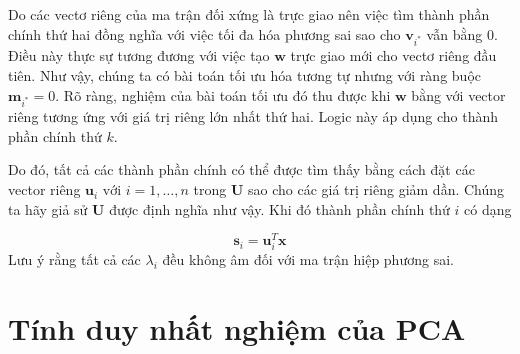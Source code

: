 \documentclass[12pt,a4paper,oneside]{report}
\numberwithin{equation}{section}
\begin{document}
Do các vectơ riêng của ma trận đối xứng là trực giao nên việc tìm thành phần chính thứ hai đồng nghĩa với việc tối đa hóa phương sai sao cho $\mathbf{v}_{i^{*}}$ vẫn bằng 0. Điều này thực sự tương đương với việc tạo $\mathbf{w}$ trực giao mới cho vectơ riêng đầu tiên. Như vậy, chúng ta có bài toán tối ưu hóa tương tự nhưng với ràng buộc $\mathbf{m}_{i^{*}}=0$. Rõ ràng, nghiệm của bài toán tối ưu đó thu được khi $\mathbf{w}$ bằng với vector riêng tương ứng với giá trị riêng lớn nhất thứ hai. Logic này áp dụng cho thành phần chính thứ $k$.

Do đó, tất cả các thành phần chính có thể được tìm thấy bằng cách đặt các vector riêng $\mathbf{u}_{i}\text { với } i=1, \ldots, n$ trong $\mathbf{U}$ sao cho các giá trị riêng giảm dần. Chúng ta hãy giả sử $\mathbf{U}$ được định nghĩa như vậy. Khi đó thành phần chính thứ $i$ có dạng

$$
\mathbf{s}_{i}=\mathbf{u}_{i}^{T}\mathbf{ x}
$$
Lưu ý rằng tất cả các $\lambda_{i}$ đều không âm đối với ma trận hiệp phương sai.

\section{Tính duy nhất nghiệm của PCA}
\end{document}
